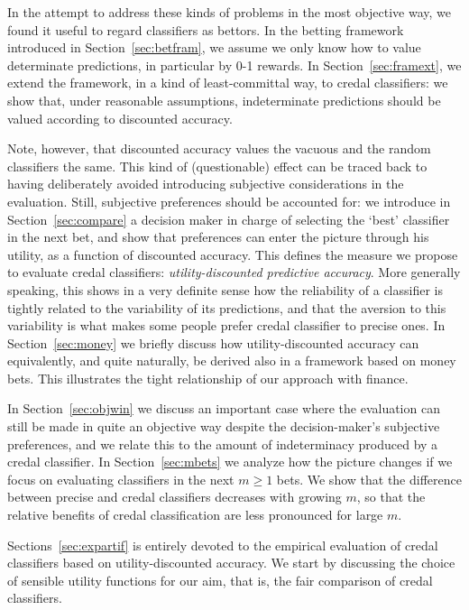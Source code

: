 \documentclass[a4paper,10pt,reqno]{amsart}
\theoremstyle{remark}
\begin{document}
In the attempt to address these kinds of problems in the most objective way, we found it useful to regard classifiers as bettors. In the betting framework introduced in Section~\ref{sec:betfram}, we assume we only know how to value determinate predictions, in particular by 0-1 rewards. In Section~\ref{sec:framext}, we extend the framework, in a kind of least-committal way, to credal classifiers: we show that, under reasonable assumptions, indeterminate predictions should be valued according to discounted accuracy. 

Note, however, that discounted accuracy values the vacuous and the random classifiers the same. This kind of (questionable) effect can be traced back to having deliberately avoided introducing subjective considerations in the evaluation. Still, subjective preferences should be accounted for: we introduce in Section~\ref{sec:compare} a decision maker in charge of selecting the `best' classifier in the next bet, and show that preferences can enter the picture through his utility, as a function of discounted accuracy. This defines the measure we propose to evaluate credal classifiers: \emph{utility-discounted predictive accuracy}. More generally speaking, this shows in a very definite sense how the reliability of a classifier is tightly related to the variability of its predictions, and that the aversion to this variability is what makes some people prefer credal classifier to precise ones. In Section~\ref{sec:money} we briefly discuss how utility-discounted accuracy can equivalently, and quite naturally, be derived also in a framework based on money bets. This illustrates the tight relationship of our approach with finance.

In Section~\ref{sec:objwin} we discuss an important case where the evaluation can still be made in quite an objective way despite the decision-maker's subjective preferences, and we relate this to the amount of indeterminacy produced by a credal classifier. In Section~\ref{sec:mbets} we analyze how the picture changes if we focus on evaluating classifiers in the next $m\ge1$ bets. We show that the difference between precise and credal classifiers decreases with growing $m$, so that the relative benefits of credal classification are less pronounced for large $m$.

Sections~\ref{sec:expartif} is entirely devoted to the empirical evaluation of credal classifiers based on utility-discounted accuracy. We start by discussing the choice of sensible utility functions for our aim, that is, the fair comparison of credal classifiers. 
\end{document}

